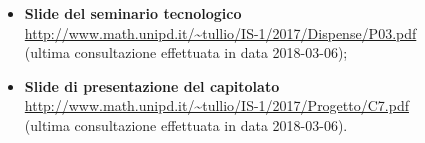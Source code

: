 \begin{itemize}
               	\item
               		\textbf{Slide del seminario tecnologico} \\
               		\url{http://www.math.unipd.it/~tullio/IS-1/2017/Dispense/P03.pdf} \\
               		(ultima consultazione effettuata in data 2018-03-06);
               		
               	\item
               		\textbf{Slide di presentazione del capitolato} \\
               		\url{http://www.math.unipd.it/~tullio/IS-1/2017/Progetto/C7.pdf} \\
               		(ultima consultazione effettuata in data 2018-03-06).

            \end{itemize}

